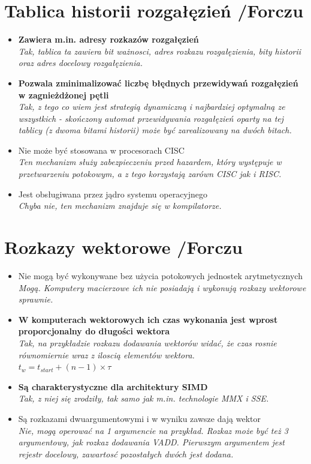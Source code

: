 \documentclass[a4paper,twoside]{article}
\begin{document}
\section{Tablica historii rozgałęzień {\small /Forczu}}
	\begin{itemize}
    \item \textbf{Zawiera m.in. adresy rozkazów rozgałęzień}\\
    {\small \emph{Tak, tablica ta zawiera bit ważnosci, \emph{adres rozkazu rozgałęzienia}, bity historii oraz \emph{adres docelowy rozgałęzienia}.}}
    \item \textbf{Pozwala zminimalizować liczbę błędnych przewidywań rozgałęzień w zagnieżdżonej pętli}\\
    {\small \emph{Tak, z tego co wiem jest strategią dynamiczną i najbardziej optymalną ze wszystkich - skończony automat przewidywania rozgałęzień oparty na tej tablicy (z dwoma bitami historii) może być zarealizowany na dwóch bitach.}}
    \item Nie może być stosowana w procesorach CISC\\
    {\small \emph{Ten mechanizm służy zabezpieczeniu przed hazardem, który występuje w przetwarzeniu potokowym, a z tego korzystają zarówn CISC jak i RISC.}}
    \item Jest obsługiwana przez jądro systemu operacyjnego\\
    {\small \emph{Chyba nie, ten mechanizm znajduje się w kompilatorze.}}
    \end{itemize}

\section{Rozkazy wektorowe {\small /Forczu}}
	\begin{itemize}
    \item Nie mogą być wykonywane bez użycia potokowych jednostek arytmetycznych\\
    {\small \emph{Mogą. Komputery macierzowe ich nie posiadają i wykonują rozkazy wektorowe sprawnie.}}
    \item \textbf{W komputerach wektorowych ich czas wykonania jest wprost proporcjonalny do długości wektora}\\
    {\small \emph{Tak, na przykładzie rozkazu dodawania wektorów widać, że czas rosnie równomiernie wraz z iloscią elementów wektora.\\
    $t_{w}=t_{start}+(n-1)\times\tau$}}
    \item \textbf{Są charakterystyczne dla architektury SIMD}\\
    {\small \emph{Tak, z niej się zrodziły, tak samo jak m.in. technologie MMX i SSE.}}
    \item Są rozkazami dwuargumentowymi i w wyniku zawsze dają wektor\\
    {\small \emph{Nie, mogą operować na 1 argumencie na przykład. Rozkaz może być też 3 argumentowy, jak rozkaz dodawania VADD. Pierwszym argumentem jest rejestr docelowy, zawartosć pozostałych dwóch jest dodana.}}
    \end{itemize}
\end{document}
